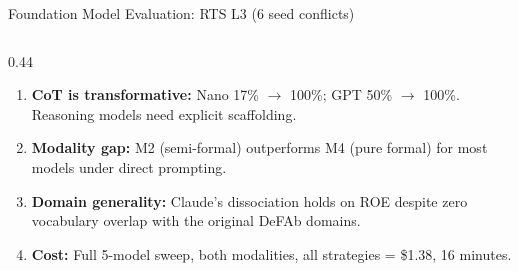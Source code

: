 \documentclass[aspectratio=169, 10pt]{beamer}
\begin{document}
\begin{frame}{Foundation Model Evaluation: RTS L3 (6 seed conflicts)}
\begin{columns}[T]
\begin{column}{0.44\textwidth}
      \begin{enumerate}[leftmargin=1.2em, itemsep=4pt]
        \item \textbf{CoT is transformative:}
              Nano 17\% $\to$ 100\%; GPT 50\% $\to$ 100\%.
              Reasoning models need explicit scaffolding.

        \item \textbf{Modality gap:}
              M2 (semi-formal) outperforms M4 (pure formal) for
              most models under direct prompting.

        \item \textbf{Domain generality:}
              Claude's dissociation holds on ROE despite zero
              vocabulary overlap with the original DeFAb domains.

        \item \textbf{Cost:}
              Full 5-model sweep, both modalities, all strategies
              = \$1.38, 16 minutes.
      \end{enumerate}
    \end{column}
  \end{columns}
\end{frame}
\end{document}
